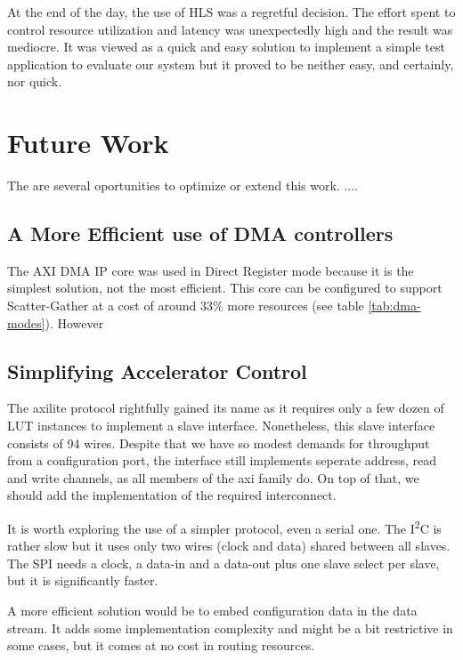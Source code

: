 
At the end of the day, the use of HLS was a regretful decision.
The effort spent to control resource utilization and latency was unexpectedly high and the result was mediocre.
It was viewed as a quick and easy solution to implement a simple test application to evaluate our system 
but it proved to be neither easy, and certainly, nor quick.

\section{Future Work}

The are several oportunities to optimize or extend this work.
....

\subsection{A More Efficient use of DMA controllers}

The AXI DMA IP core was used in Direct Register mode because it is the simplest solution, not the most efficient.
This core can be configured to support Scatter-Gather at a cost of around 33\% more resources (see table \ref{tab:dma-modes}).
However


\subsection{Simplifying Accelerator Control}

The \gls{axilite} protocol rightfully gained its name as it requires only a few dozen of LUT instances to implement a slave interface.
Nonetheless, this slave interface consists of 94 wires. Despite that we have so modest demands for throughput from a configuration
port, the interface still implements seperate address, read and write channels, as all members of the \gls{axi} family do.
On top of that, we should add the implementation of the required interconnect.

It is worth exploring the use of a simpler protocol, even a serial one. The I\textsuperscript{2}C is rather slow but it uses only
two wires (clock and data) shared between all slaves. The SPI needs a clock, a data-in and a data-out plus one slave select per slave,
but it is significantly faster.

A more efficient solution would be to embed configuration data in the data stream. It adds some implementation complexity
and might be a bit restrictive in some cases, but it comes at no cost in routing resources.






